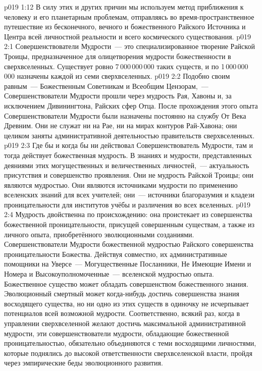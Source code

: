 \vs p019 1:12 \pc В силу этих и других причин мы используем метод приближения к человеку и его планетарным проблемам, отправляясь во время\hyp{}пространственное путешествие из бесконечного, вечного и божественного Райского Источника и Центра всей личностной реальности и всего космического существования.
\vs p019 2:1 Совершенствователи Мудрости~--- это специализированное творение Райской Троицы, предназначенное для олицетворения мудрости божественности в сверхвселенных. Существует ровно 7\,000\,000\,000 таких существ, и по 1\,000\,000\,000 назначены каждой из семи сверхвселенных.
\vs p019 2:2 Подобно своим равным~--- Божественным Советникам и Всеобщим Цензорам,~--- Совершенствователи Мудрости прошли через мудрость Рая, Хавоны и, за исключением Дивинингтона, Райских сфер Отца. После прохождения этого опыта Совершенствователи Мудрости были назначены постоянно на службу От Века Древним. Они не служат ни на Рае, ни на мирах контуров Рай\hyp{}Хавона; они целиком заняты административной деятельностью правительств сверхвселенных.
\vs p019 2:3 \pc Где бы и когда бы ни действовал Совершенствователь Мудрости, там и тогда действует божественная мудрость. В знаниях и мудрости, представленных деяниями этих могущественных и величественных личностей,~--- актуальность присутствия и совершенство проявления. Они не  мудрость Райской Троицы; они являются  мудростью. Они являются источниками мудрости по применению вселенских знаний для всех учителей; они~--- источники благоразумия и кладези проницательности для институтов учёбы и различения во всех вселенных.
\vs p019 2:4 Мудрость двойственна по происхождению: она проистекает из совершенства божественной проницательности, присущей совершенным существам, а также из личного опыта, приобретённого эволюционными созданиями. Совершенствователи Мудрости  божественной мудростью Райского совершенства проницательности Божества. Действуя совместно, их административные помощники на Уверсе~--- Могущественные Посланники, Не Имеющие Имени и Номера и Высокоуполномоченные~---  вселенской мудростью опыта. Божественное существо может обладать совершенством божественного знания. Эволюционный смертный может когда\hyp{}нибудь достичь совершенства знания восходящего существа, но ни одно из этих существ в одиночку не исчерпывает потенциалов всей возможной мудрости. Соответственно, всякий раз, когда в управлении сверхвселенной желают достичь максимальной административной мудрости, эти совершенствователи мудрости, обладающие божественной проницательностью, обязательно объединяются с теми восходящими личностями, которые поднялись до высокой ответственности сверхвселенской власти, пройдя через эмпирические беды эволюционного развития.
